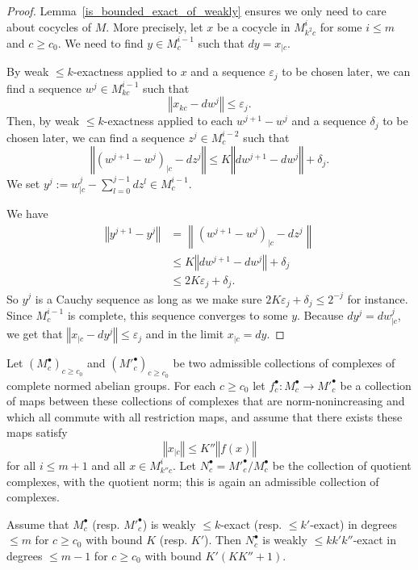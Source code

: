 \begin{proof}
  \leanok
  Lemma~\ref{is_bounded_exact_of_weakly} ensures we only need to care about cocycles
  of $M$. More precisely, let $x$ be a cocycle in $M^i_{k^2c}$ for some $i ≤ m$ and $c ≥ c_0$.
  We need to find $y \in M^{i-1}_c$ such that $dy = x_{|c}$.

  By weak $\leq k$-exactness applied to $x$ and a sequence $ε_j$ to be chosen later, we can find
  a sequence $w^j \in M^{i-1}_{kc}$ such that
  \[
    ‖x_{kc} - dw^j‖ ≤ ε_j.
  \]
  Then, by weak $\leq k$-exactness applied to each $w^{j + 1} - w^j$ and a sequence $δ_j$ to be chosen later, we can find
  a sequence $z^j \in M^{i-2}_{c}$ such that
  \[
    ‖(w^{j+1} - w^j)_{|c} - dz^j‖ ≤ K‖dw^{j+1} - dw^j‖ + δ_j.
  \]
  We set $y^j := w^j_{|c} - \sum_{l=0}^{j-1} dz^l ∈ M^{i-1}_c$.


  We have
  \begin{align*}
    ‖y^{j + 1} - y^j‖ &=  \left\|(w^{j + 1} - w^j)_{|c} - dz^j\right\| \\
                      &≤  K‖dw^{j+1} - dw^j‖ + δ_j \\
                      &≤  2Kε_j + δ_j.
  \end{align*}
  So $y^j$ is a Cauchy sequence as long as we make sure $2Kε_j + δ_j ≤ 2^{-j}$ for instance.
  Since $M^{i-1}_c$ is complete, this sequence converges to some $y$.
  Because $dy^j = dw^j_{|c}$, we get that $‖x_{|c} - dy^j‖ ≤ ε_j$ and in the limit $x_{|c} = dy$.
\end{proof}

\begin{proposition}
  \label{weaksnakelemma}
  \leanok
  Let $(M^\bullet_c)_{c\geq c_0}$ and $(M'^\bullet_c)_{c\geq c_0}$ be two admissible collections
  of complexes of complete normed abelian groups.
  For each $c\geq c_0$ let $f^\bullet_c: M^\bullet_c\to M'^\bullet_c$ be a collection of maps
  between these collections of complexes
  that are norm-nonincreasing and which all commute with all restriction maps,
  and assume that there exists these maps satisfy
  \[
    ‖x_{|c}‖ ≤ K''‖f(x)‖
  \]
  for all $i ≤ m+1$ and all $x\in M^i_{k''c}$.
  Let $N^\bullet_c=M'^\bullet_c/M^\bullet_c$
  be the collection of quotient complexes, with the quotient norm;
  this is again an admissible collection of complexes.

  Assume that $M^\bullet_c$ (resp. $M'^\bullet_c$) is weakly $\leq k$-exact
  (resp. $≤ k'$-exact) in degrees $\leq m$ for $c\geq c_0$ with bound $K$
  (resp. $K'$).
  Then $N^\bullet_c$ is weakly $\leq kk'k''$-exact in degrees $\leq m-1$ for $c\geq c_0$
  with bound $K'(KK'' + 1)$.
\end{proposition}


